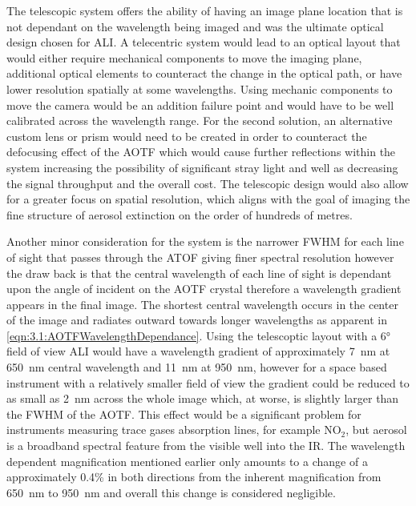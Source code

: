 \documentclass[12pt]{article}
\begin{document}
The telescopic system offers the ability of having an image plane location that is not dependant on the wavelength being imaged and was the ultimate optical design chosen for ALI. A telecentric system would lead to an optical layout that would either require mechanical components to move the imaging plane, additional optical elements to counteract the change in the optical path, or have lower resolution spatially at some wavelengths. Using mechanic components to move the camera would be an addition failure point and would have to be well calibrated across the wavelength range. For the second solution, an alternative custom lens or prism would need to be created in order to counteract the defocusing effect of the AOTF which would cause further reflections within the system increasing the possibility of significant stray light and well as decreasing the signal throughput and the overall cost. The telescopic design would also allow for a greater focus on spatial resolution, which aligns with the goal of imaging the fine structure of aerosol extinction on the order of hundreds of metres.

Another minor consideration for the system is the narrower FWHM for each line of sight that passes through the ATOF giving finer spectral resolution however the draw back is that the central wavelength of each line of sight is dependant upon the angle of incident on the AOTF crystal therefore a wavelength gradient appears in the final image. The shortest central wavelength occurs in the center of the image and radiates outward towards longer wavelengths as apparent in \autoref{eqn:3.1:AOTFWavelengthDependance}. Using the telescoptic layout with a 6\si{\degree} field of view ALI would have a wavelength gradient of approximately 7~nm at 650~nm central wavelength and 11~nm at 950~nm, however for a space based instrument with a relatively smaller field of view the gradient could be reduced to as small as 2~nm across the whole image which, at worse, is slightly larger than the FWHM of the AOTF. This effect would be a significant problem for instruments measuring trace gases absorption lines, for example NO$_{2}$, but aerosol is a broadband spectral feature from the visible well into the IR. The wavelength dependent magnification mentioned earlier only amounts to a change of a approximately 0.4\% in both directions from the inherent magnification from 650~nm to 950~nm and overall this change is considered negligible.
\end{document}
